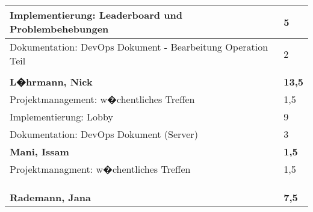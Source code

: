 \documentclass[a4paper,11pt]{scrartcl}
\begin{document}
\begin{longtable}{| p{13.8cm} | C{2.4cm} |}
  Implementierung: Leaderboard und Problembehebungen
	&
  5
	\\
	\hline

  Dokumentation: DevOps Dokument - Bearbeitung Operation Teil
	&
  2
	\\
	\hline


	&

	\\
	\hline
	\hline


	\textbf{L�hrmann, Nick} & \textbf{13,5}\\ %
	\hline

	Projektmanagement: w�chentliches Treffen
	&
	1,5
	\\
	\hline

	Implementierung: Lobby
	&
  9
	\\
	\hline

  Dokumentation: DevOps Dokument (Server)
	&
  3
	\\
	\hline


	\textbf{Mani, Issam} & \textbf{1,5}\\ %
	\hline

  Projektmanagment: w�chentliches Treffen
	&
  1,5
	\\
	\hline


	&

	\\
	\hline


	&

	\\
	\hline


	&

	\\
	\hline
	\hline


	\textbf{Rademann, Jana} & \textbf{7,5}\\ %
	\hline


\end{longtable}
\end{document}
